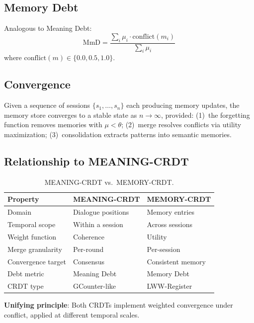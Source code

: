 \documentclass[11pt,a4paper]{article}
\begin{document}
\subsection{Memory Debt}

Analogous to Meaning Debt:
\[
  \text{MmD} = \frac{\sum_{i} \mu_i \cdot \text{conflict}(m_i)}
                     {\sum_{i} \mu_i}
\]
where $\text{conflict}(m) \in \{0.0, 0.5, 1.0\}$.

\subsection{Convergence}

\begin{theorembox}
Given a sequence of sessions $\{s_1, \ldots, s_n\}$ each producing
memory updates, the memory store converges to a stable state as
$n \to \infty$, provided: (1)~the forgetting function removes memories
with $\mu < \theta$; (2)~merge resolves conflicts via utility
maximization; (3)~consolidation extracts patterns into semantic
memories.
\end{theorembox}

\subsection{Relationship to MEANING-CRDT}

\begin{table}[H]
\centering\small
\caption{MEANING-CRDT vs.\ MEMORY-CRDT.}\label{tab:crdtcomp}
\begin{tabular}{@{}lll@{}}
\toprule
\textbf{Property} & \textbf{MEANING-CRDT} & \textbf{MEMORY-CRDT} \\
\midrule
Domain          & Dialogue positions & Memory entries \\
Temporal scope  & Within a session   & Across sessions \\
Weight function & Coherence          & Utility \\
Merge granularity & Per-round        & Per-session \\
Convergence target & Consensus       & Consistent memory \\
Debt metric     & Meaning Debt       & Memory Debt \\
CRDT type       & GCounter-like      & LWW-Register \\
\bottomrule
\end{tabular}
\end{table}

\textbf{Unifying principle}: Both CRDTs implement weighted convergence
under conflict, applied at different temporal scales.
\end{document}
